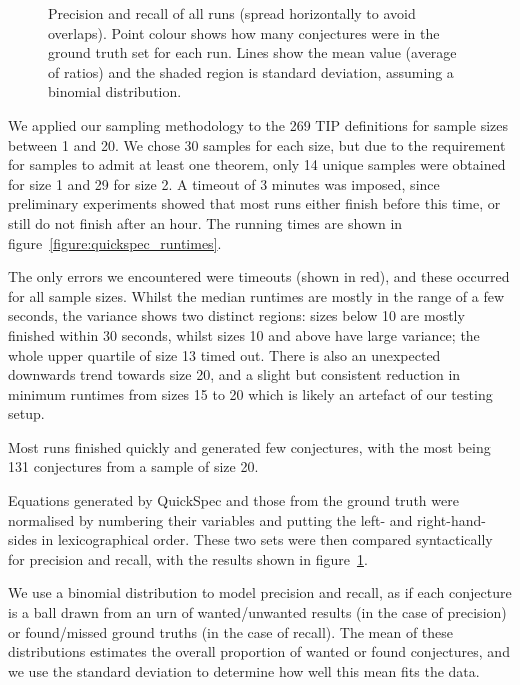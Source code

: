 \begin{figure}
  \centering
  
  \caption{Precision and recall of all runs (spread horizontally to avoid
    overlaps). Point colour shows how many conjectures were in the ground truth
    set for each run. Lines show the mean value (average of ratios) and the
    shaded region is standard deviation, assuming a binomial distribution.}
  \label{figure:quickspec_precRec}
\end{figure}

We applied our sampling methodology to the 269 TIP definitions for sample sizes
between 1 and 20. We chose 30 samples for each size, but due to the requirement
for samples to admit at least one theorem, only 14 unique samples were obtained
for size 1 and 29 for size 2. A timeout of 3 minutes was imposed, since
preliminary experiments showed that most runs either finish before this time, or
still do not finish after an hour. The running times are shown in
figure~\ref{figure:quickspec_runtimes}.

The only errors we encountered were timeouts (shown in red), and these occurred
for all sample sizes. Whilst the median runtimes are mostly in the range of a
few seconds, the variance shows two distinct regions: sizes below 10 are mostly
finished within 30 seconds, whilst sizes 10 and above have large variance; the
whole upper quartile of size 13 timed out. There is also an unexpected downwards
trend towards size 20, and a slight but consistent reduction in minimum runtimes
from sizes 15 to 20 which is likely an artefact of our testing setup.

Most runs finished quickly and generated few conjectures, with the most being
131 conjectures from a sample of size 20.

Equations generated by QuickSpec and those from the ground truth were normalised
by numbering their variables and putting the left- and right-hand-sides in
lexicographical order. These two sets were then compared syntactically for
precision and recall, with the results shown in
figure~\ref{figure:quickspec_precRec}.

We use a binomial distribution to model precision and recall, as if each
conjecture is a ball drawn from an urn of wanted/unwanted results (in the case
of precision) or found/missed ground truths (in the case of recall). The mean of
these distributions estimates the overall proportion of wanted or found
conjectures, and we use the standard deviation to determine how well this mean
fits the data.

